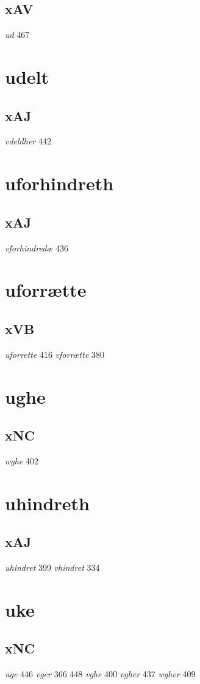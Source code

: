 \documentclass[a4paper,twocolumn]{article}
\begin{document}
\subsection{xAV}
\label{sec:org917c9d9}
\emph{ud} 467 
\section{udelt}
\label{sec:org9ba2b5e}
\subsection{xAJ}
\label{sec:orgf9cbd8b}
\emph{vdeldher} 442 
\section{uforhindreth}
\label{sec:orgf82be4c}
\subsection{xAJ}
\label{sec:orgfcc475b}
\emph{vforhindredæ} 436 
\section{uforrætte}
\label{sec:org7e99a9b}
\subsection{xVB}
\label{sec:orgc9256fb}
\emph{uforrette} 416 \emph{vforrætte} 380 
\section{ughe}
\label{sec:org23d7fba}
\subsection{xNC}
\label{sec:org24b841d}
\emph{wghe} 402 
\section{uhindreth}
\label{sec:org28cacef}
\subsection{xAJ}
\label{sec:org411369d}
\emph{uhindret} 399 \emph{vhindret} 334 
\section{uke}
\label{sec:orgac96ad6}
\subsection{xNC}
\label{sec:orge5144d6}
\emph{uge} 446 \emph{vger} 366 448 \emph{vghe} 400 \emph{vgher} 437 \emph{wgher} 409 
\end{document}
